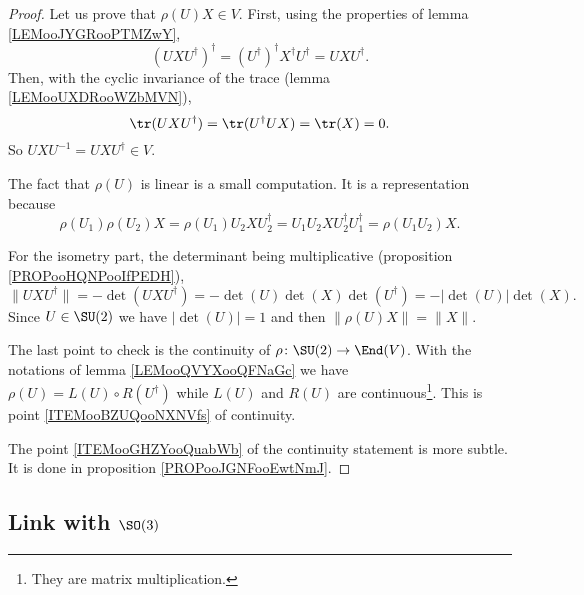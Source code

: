 \begin{proof}
    Let us prove that \( \rho(U)X\in V\). First, using the properties of lemma \ref{LEMooJYGRooPTMZwY},
    \begin{equation}
        (UXU^{\dag})^{\dag}=(U^{\dag})^{\dag}X^{\dag}U^{\dag}=UXU^{\dag}.
    \end{equation}
    Then, with the cyclic invariance of the trace (lemma \ref{LEMooUXDRooWZbMVN}),
    \begin{equation}
        \tr(UXU^{\dag})=\tr(U^{\dag}UX)=\tr(X)=0.
    \end{equation}
    So \( UXU^{-1}=UXU^{\dag}\in V\).

    The fact that \( \rho(U)\) is linear is a small computation. It is a representation because
    \begin{equation}
        \rho(U_1)\rho(U_2)X=\rho(U_1)U_2XU_2^{\dag}=U_1U_2XU_2^{\dag}U_1^{\dag}=\rho(U_1U_2)X.
    \end{equation}
    
    For the isometry part, the determinant being multiplicative (proposition \ref{PROPooHQNPooIfPEDH}),
    \begin{equation}
        \| UXU^{\dag} \|=-\det(UXU^{\dag})=-\det(U)\det(X)\det(U^{\dag})=-| \det(U) |\det(X).
    \end{equation}
    Since \( U\in\SU(2)\) we have \( | \det(U) |=1\) and then \( \| \rho(U)X \|=\| X \|\).

    The last point to check is the continuity of \( \rho\colon \SU(2)\to \End(V)\). With the notations of lemma \ref{LEMooQVYXooQFNaGc} we have \( \rho(U)=L(U)\circ R(U^{\dag})\) while \( L(U)\) and \( R(U)\) are continuous\footnote{They are matrix multiplication.}. This is point \ref{ITEMooBZUQooNXNVfs} of continuity.

    The point \ref{ITEMooGHZYooQuabWb} of the continuity statement is more subtle. It is done in proposition \ref{PROPooJGNFooEwtNmJ}.
\end{proof}

\subsection{Link with \texorpdfstring{$ \SO(3)$}{SO(3)}}

